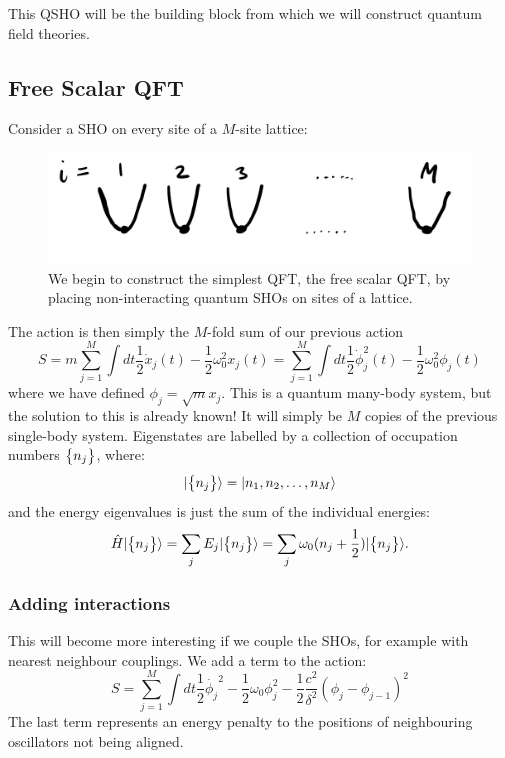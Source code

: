 This QSHO will be the building block from which we will construct quantum field theories.

\subsection{Free Scalar QFT}
Consider a SHO on every site of a $M$-site lattice:
\begin{figure}[htbp]
    \centering
    \includegraphics[scale=0.4]{Lectures/Figures/qsho_chain.png}
    \caption{We begin to construct the simplest QFT, the free scalar QFT, by placing non-interacting quantum SHOs on sites of a lattice.}
    \label{fig:qsho_chain}
\end{figure}
The action is then simply the $M$-fold sum of our previous action
\begin{equation}
    S = m\sum_{j=1}^M\int dt \frac{1}{2}\dot{x}_j(t) - \frac{1}{2}\omega_0^2x_j(t) = \sum_{j=1}^M\int dt \frac{1}{2}\dot{\phi}_j^2(t) - \frac{1}{2}\omega_0^2\phi_j(t)
\end{equation}
where we have defined $\phi_j = \sqrt{m}x_j$. This is a quantum many-body system, but the solution to this is already known! It will simply be $M$ copies of the previous single-body system. Eigenstates are labelled by a collection of occupation numbers $\set{n_j}$, where:
\begin{equation}
    \lvert \set{n_j} \rangle = \lvert n_1, n_2, \ldots, n_M \rangle
\end{equation}
and the energy eigenvalues is just the sum of the individual energies:
\begin{equation}
    \hat{H}\lvert \set{n_j} \rangle = \sum_j E_j \lvert \set{n_j} \rangle = \sum_j \omega_0(n_j + \frac{1}{2})\lvert \set{n_j} \rangle.
\end{equation}

\subsubsection*{Adding interactions}
This will become more interesting if we couple the SHOs, for example with nearest neighbour couplings. We add a term to the action:
\begin{equation}
    S = \sum_{j=1}^M \int dt \frac{1}{2}\dot{\phi_j}^2 - \frac{1}{2}\omega_0\phi_j^2 - \frac{1}{2}\frac{c^2}{\delta^2}(\phi_j - \phi_{j-1})^2
\end{equation}
The last term represents an energy penalty to the positions of neighbouring oscillators not being aligned. 

